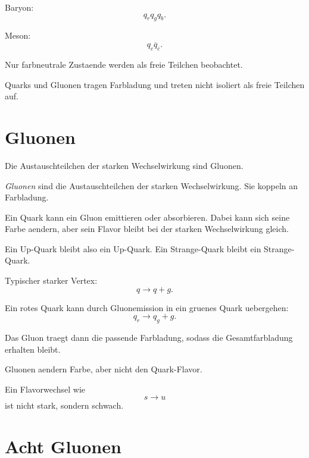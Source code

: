 \begin{formulabox}
Baryon:
\[
    q_r q_g q_b.
\]

Meson:
\[
    q_c \overline{q}_{\overline{c}}.
\]
\end{formulabox}

\begin{examtipbox}
Nur farbneutrale Zustaende werden als freie Teilchen beobachtet.

Quarks und Gluonen tragen Farbladung und treten nicht isoliert als freie Teilchen auf.
\end{examtipbox}

\section{Gluonen}

Die Austauschteilchen der starken Wechselwirkung sind Gluonen.

\begin{definitionbox}
\emph{Gluonen} sind die Austauschteilchen der starken Wechselwirkung.
Sie koppeln an Farbladung.
\end{definitionbox}

\begin{conceptbox}
Ein Quark kann ein Gluon emittieren oder absorbieren.
Dabei kann sich seine Farbe aendern, aber sein Flavor bleibt bei der starken
Wechselwirkung gleich.

Ein Up-Quark bleibt also ein Up-Quark.
Ein Strange-Quark bleibt ein Strange-Quark.
\end{conceptbox}

\begin{formulabox}
Typischer starker Vertex:
\[
    q \rightarrow q + g.
\]
\end{formulabox}

\begin{examplebox}
Ein rotes Quark kann durch Gluonemission in ein gruenes Quark uebergehen:
\[
    q_r \rightarrow q_g + g.
\]

Das Gluon traegt dann die passende Farbladung, sodass die Gesamtfarbladung erhalten
bleibt.
\end{examplebox}

\begin{examtipbox}
Gluonen aendern Farbe, aber nicht den Quark-Flavor.

Ein Flavorwechsel wie
\[
    s \rightarrow u
\]
ist nicht stark, sondern schwach.
\end{examtipbox}

\section{Acht Gluonen}

